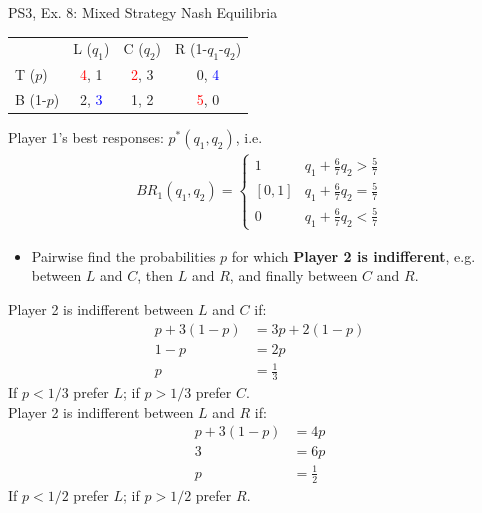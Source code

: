\begin{frame}{PS3, Ex. 8: Mixed Strategy Nash Equilibria}
  \begin{multicols}{2}
    \begin{table}
      \begin{tabular}{l|c|c|c|}
          \multicolumn{1}{c}{}  & \multicolumn{1}{c}{L ($q_1$)} & \multicolumn{1}{c}{C ($q_2$)} & \multicolumn{1}{c}{R (1-$q_1$-$q_2$)} \\\cline{2-4}
          T ($p$)   & \textcolor{red}{4}, 1 & \textcolor{red}{2}, 3 & 0, \textcolor{blue}{4} \\\cline{2-4}
          B (1-$p$) & 2, \textcolor{blue}{3} & 1, 2 & \textcolor{red}{5}, 0 \\\cline{2-4}
      \end{tabular}
    \end{table}
    Player 1's best responses: $p^{*}(q_1,q_2)$, i.e.
    \begin{align*}
      BR_1(q_1,q_2)=
      \left\{ \begin{array}{ll}
          1                 & q_1 + \frac{6}{7}q_2 > \frac{5}{7}\\
          \left[0,1\right]  & q_1 + \frac{6}{7}q_2 = \frac{5}{7}\\
          0                 & q_1 + \frac{6}{7}q_2 < \frac{5}{7}
      \end{array}\right.
    \end{align*}
    \begin{itemize}
      \item[4.] Pairwise find the probabilities $p$ for which \textbf{Player 2 is indifferent}, e.g. between $L$ and $C$, then $L$ and $R$, and finally between $C$ and $R$.
    \end{itemize}
  \vfill\null \columnbreak
    Player 2 is indifferent between $L$ and $C$ if:
    \begin{align*}
      p+3(1-p)&= 3p + 2(1-p) \\
      1-p     &= 2p \\
      p       &= \frac{1}{3}
    \end{align*}
    If $p<1/3$ prefer $L$; if $p>1/3$ prefer $C$.\\\medskip
    Player 2 is indifferent between $L$ and $R$ if:
    \begin{align*}
      p+3(1-p)&= 4p \\
      3       &= 6p \\
      p       &= \frac{1}{2}
    \end{align*}
    If $p<1/2$ prefer $L$; if $p>1/2$ prefer $R$.\\\medskip
  \vfill\null
  \end{multicols}
\end{frame}

